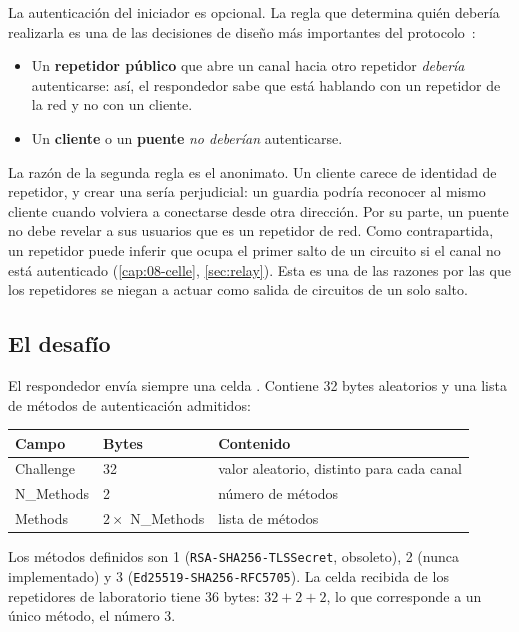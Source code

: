 La autenticación del iniciador es opcional. La regla que determina quién debería realizarla es una de las decisiones de diseño más importantes del protocolo~:

\begin{itemize}
  \item Un \textbf{repetidor público} que abre un canal hacia otro repetidor \emph{debería} autenticarse: así, el respondedor sabe que está hablando con un repetidor de la red y no con un cliente.
  \item Un \textbf{cliente} o un \textbf{puente} \emph{no deberían} autenticarse.
\end{itemize}

La razón de la segunda regla es el anonimato. Un cliente carece de identidad de repetidor, y crear una sería perjudicial: un guardia podría reconocer al mismo cliente cuando volviera a conectarse desde otra dirección. Por su parte, un puente no debe revelar a sus usuarios que es un repetidor de red. Como contrapartida, un repetidor puede inferir que ocupa el primer salto de un circuito si el canal no está autenticado (\cref{cap:08-celle}, \cref{sec:relay}). Esta es una de las razones por las que los repetidores se niegan a actuar como salida de circuitos de un solo salto.

\subsection{El desafío}

El respondedor envía siempre una celda . Contiene 32 bytes aleatorios y una lista de métodos de autenticación admitidos:

\begin{center}
\begin{tabular}{lll}
\toprule
Campo & Bytes & Contenido \\
\midrule
Challenge & 32 & valor aleatorio, distinto para cada canal \\
N\_Methods & 2 & número de métodos \\
Methods & $2 \times$ N\_Methods & lista de métodos \\
\bottomrule
\end{tabular}
\end{center}

Los métodos definidos son 1 (\texttt{RSA-SHA256-TLSSecret}, obsoleto), 2 (nunca implementado) y 3 (\texttt{Ed25519-SHA256-RFC5705}). La celda recibida de los repetidores de laboratorio tiene 36 bytes: $32 + 2 + 2$, lo que corresponde a un único método, el número 3.

